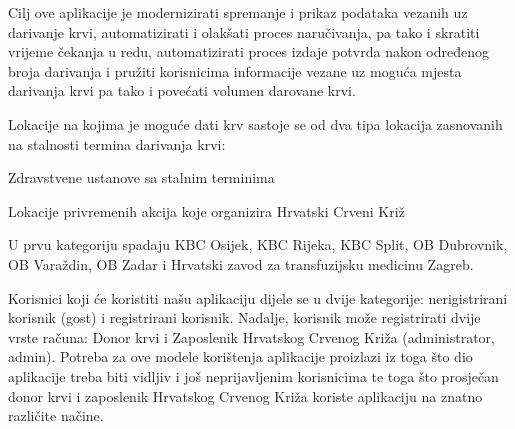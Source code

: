 		Cilj ove aplikacije je modernizirati spremanje i prikaz podataka vezanih uz darivanje krvi, automatizirati i olakšati proces naručivanja, pa tako i skratiti vrijeme čekanja u redu, automatizirati proces izdaje potvrda nakon određenog broja darivanja i pružiti korisnicima informacije vezane uz moguća mjesta darivanja krvi pa tako i povećati volumen darovane krvi. 

		Lokacije na kojima je moguće dati krv sastoje se od dva tipa lokacija zasnovanih na stalnosti termina darivanja krvi:
		\begin{packed_enum}

					\item Zdravstvene ustanove sa stalnim terminima
					\item Lokacije privremenih akcija koje organizira Hrvatski Crveni Križ

		\end{packed_enum}

		U prvu kategoriju spadaju KBC Osijek, KBC Rijeka, KBC
		Split, OB Dubrovnik, OB Varaždin, OB Zadar i Hrvatski zavod za transfuzijsku medicinu Zagreb. 

		Korisnici koji će koristiti našu aplikaciju dijele se u dvije kategorije: nerigistrirani korisnik (gost) i registrirani korisnik. Nadalje, korisnik može registrirati dvije vrste računa: Donor krvi i Zaposlenik Hrvatskog Crvenog Križa (administrator, admin). Potreba za ove modele korištenja aplikacije proizlazi iz toga što dio aplikacije treba biti vidljiv i još neprijavljenim korisnicima te toga što prosječan donor krvi i zaposlenik Hrvatskog Crvenog Križa koriste aplikaciju na znatno različite načine.

